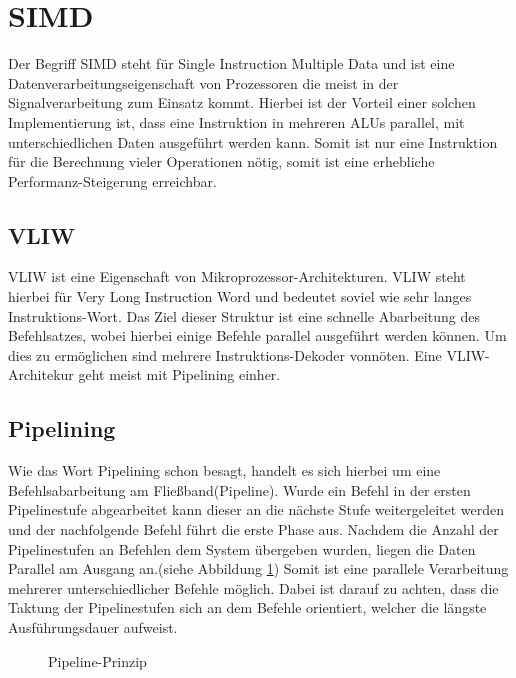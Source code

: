 \section{SIMD}
\label{sec:SIMD}
Der Begriff SIMD steht für Single Instruction Multiple Data und ist eine Datenverarbeitungseigenschaft von Prozessoren die meist in der Signalverarbeitung zum Einsatz kommt. Hierbei ist der Vorteil einer solchen Implementierung ist, dass eine Instruktion in mehreren ALUs parallel, mit unterschiedlichen Daten ausgeführt werden kann. Somit ist nur eine Instruktion für die Berechnung vieler Operationen nötig, somit ist eine erhebliche Performanz-Steigerung erreichbar.\cite[Seite 249]{wust2010mikroprozessortechnik}

\subsection{VLIW}
\label{sec:VLIW}
VLIW ist eine Eigenschaft von Mikroprozessor-Architekturen. VLIW steht hierbei für Very Long Instruction Word und bedeutet soviel wie sehr langes Instruktions-Wort. Das Ziel dieser Struktur ist eine schnelle Abarbeitung des Befehlsatzes, wobei hierbei einige Befehle parallel ausgeführt werden können. Um dies zu ermöglichen sind mehrere Instruktions-Dekoder vonnöten. Eine VLIW-Architekur geht meist mit Pipelining einher. 

\subsection{Pipelining}
Wie das Wort Pipelining schon besagt, handelt es sich hierbei um eine Befehlsabarbeitung am Fließband(Pipeline). Wurde ein Befehl in der ersten Pipelinestufe abgearbeitet kann dieser an die nächste Stufe weitergeleitet werden und der nachfolgende Befehl führt die erste Phase aus. Nachdem die Anzahl der Pipelinestufen an Befehlen dem System übergeben wurden, liegen die Daten Parallel am Ausgang an.(siehe Abbildung \ref{fig:pipeline})  Somit ist eine parallele Verarbeitung mehrerer unterschiedlicher Befehle möglich. Dabei ist darauf zu achten, dass die Taktung der Pipelinestufen sich an dem Befehle orientiert, welcher die längste Ausführungsdauer aufweist. \cite[Seite 204]{wust2010mikroprozessortechnik}
\begin{scriptsize}
	\begin{figure}[htbp] 
		\centering
		
		\caption{Pipeline-Prinzip}
		\label{fig:pipeline}
	\end{figure}
\end{scriptsize}

